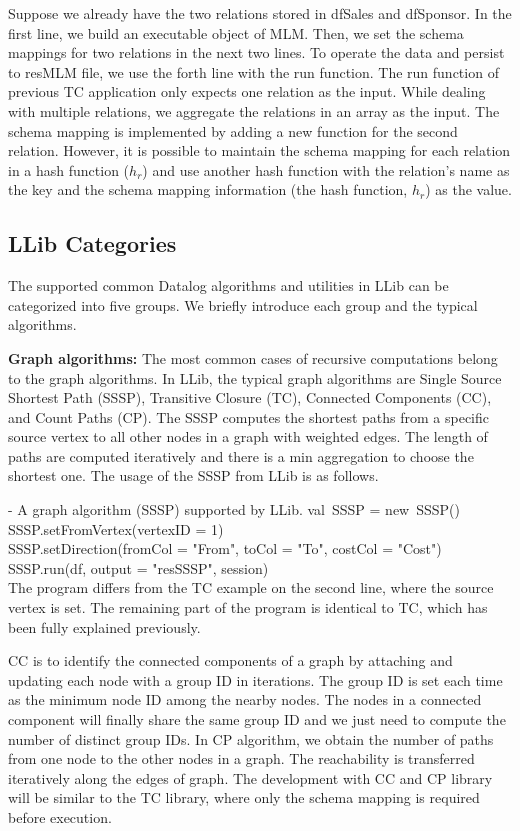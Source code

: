 \eldl
Suppose we already have the two relations stored in dfSales and dfSponsor. In the first line, we build an executable object of MLM. Then, we set the schema mappings for two relations in the next two lines. To operate the data and persist to resMLM file, we use the forth line with the run function.  The run function of previous TC application only expects one relation as the input. While dealing with multiple relations, we aggregate the relations in an array as the input. The schema mapping is implemented by adding a new function for the second relation. However, it is possible to  maintain the schema mapping for each relation in a hash function ($h_r$) and use another hash function with the relation's name as the key and the schema mapping information (the hash function, $h_r$) as the value. 
\iffalse
\subsection{LLib Categories}
The supported common Datalog algorithms and utilities in LLib can be  categorized into five groups. We briefly introduce each group and the typical algorithms. 

\textbf{Graph algorithms:} The most common cases of recursive computations  belong to the graph algorithms. In LLib, the typical graph algorithms are Single Source Shortest Path (SSSP), Transitive Closure (TC), Connected Components (CC), and Count Paths (CP). The SSSP  computes the shortest paths from a specific source vertex to all other nodes in a graph with weighted edges. The length of paths are computed iteratively and there is a min aggregation to choose the shortest one. The usage of the SSSP from LLib is as follows.

\vspace{0.5em}
 - A graph algorithm (SSSP) supported by LLib.
\bldl
val\ SSSP = new\ SSSP() \\
SSSP.setFromVertex(vertexID = 1) \\
SSSP.setDirection(fromCol = "From", toCol = "To", costCol = "Cost") \\
SSSP.run(df, output = "resSSSP", session) \\

\eldl
The program differs from the TC example on the second line, where the source vertex is set. The remaining part of the program is identical to TC, which has been fully explained previously. 

CC is to identify the connected components of a graph by attaching and updating each node with a group ID in iterations. The group ID is set each time as the minimum node ID among the nearby nodes. The nodes in a connected component will finally share the same group ID and we just need to compute the number of distinct group IDs. In CP algorithm, we obtain the number of paths from one node to  the other nodes in a graph. The reachability  is transferred iteratively along the edges of graph. The development with CC and CP library will be similar to the TC library, where only the schema mapping is required before execution. 

